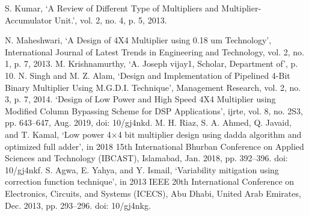 

\begin{thebibliography}{01}
     S. Kumar, ‘A Review of Different Type of Multipliers and Multiplier-Accumulator Unit.’, vol. 2, no. 4, p. 5, 2013.

     N. Maheshwari, ‘A Design of 4X4 Multiplier using 0.18 um Technology’, International Journal of Latest Trends in Engineering and Technology, vol. 2, no. 1, p. 7, 2013.
     M. Krishnamurthy, ‘A. Joseph vijay1, Scholar, Department of’, p. 10.
     N. Singh and M. Z. Alam, ‘Design and Implementation of Pipelined 4-Bit Binary Multiplier Using M.G.D.I. Technique’, Management Research, vol. 2, no. 3, p. 7, 2014.
     ‘Design of Low Power and High Speed 4X4 Multiplier using Modified Column Bypassing Scheme for DSP Applications’, ijrte, vol. 8, no. 2S3, pp. 643–647, Aug. 2019, doi: 10/gj4nkd.
     M. H. Riaz, S. A. Ahmed, Q. Javaid, and T. Kamal, ‘Low power 4×4 bit multiplier design using dadda algorithm and optimized full adder’, in 2018 15th International Bhurban Conference on Applied Sciences and Technology (IBCAST), Islamabad, Jan. 2018, pp. 392–396. doi: 10/gj4nkf.
     S. Agwa, E. Yahya, and Y. Ismail, ‘Variability mitigation using correction function technique’, in 2013 IEEE 20th International Conference on Electronics, Circuits, and Systems (ICECS), Abu Dhabi, United Arab Emirates, Dec. 2013, pp. 293–296. doi: 10/gj4nkg.

\end{thebibliography}